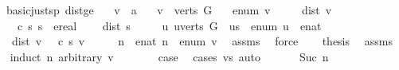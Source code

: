 \begin{isabellebody}
\endisatagproof
{\isafoldproof}%
%
\isadelimproof
\isanewline
%
\endisadelimproof
\isanewline
{}\isamarkupfalse%
\ {\isacharparenleft}\ basic{\isacharunderscore}just{\isacharunderscore}sp{\isacharparenright}\ dist{\isacharunderscore}ge{\isacharunderscore}{\isasymmu}{\isacharcolon}\isanewline
\ \ \ v\ {\isacharcolon}{\isacharcolon}\ {\isacharprime}a\isanewline
\ \ \ {\isachardoublequoteopen}v\ {\isasymin}\ verts\ G{\isachardoublequoteclose}\isanewline
\ \ \ {\isachardoublequoteopen}enum\ v\ {\isasymnoteq}\ {\isasyminfinity}{\isachardoublequoteclose}\isanewline
\ \ \ {\isachardoublequoteopen}dist\ v\ {\isasymnoteq}\ {\isacharminus}{\isasyminfinity}{\isachardoublequoteclose}\isanewline
\ \ \ {\isachardoublequoteopen}{\isasymmu}\ c\ s\ s\ {\isacharequal}\ ereal\ {}{\isachardoublequoteclose}\isanewline
\ \ \ {\isachardoublequoteopen}dist\ s\ {\isacharequal}\ {}{\isachardoublequoteclose}\isanewline
\ \ \ {\isachardoublequoteopen}{\isasymAnd}u{\isachardot}\ u{\isasymin}verts\ G\ {\isasymLongrightarrow}\ u{\isasymnoteq}s\ {\isasymLongrightarrow}\ enum\ u\ {\isasymnoteq}\ enat\ {}{\isachardoublequoteclose}\isanewline
\ \ \ {\isachardoublequoteopen}dist\ v\ {\isasymge}\ {\isasymmu}\ c\ s\ v{\isachardoublequoteclose}\isanewline
%
\isadelimproof
%
\endisadelimproof
%
\isatagproof
{}\isamarkupfalse%
\ {\isacharminus}\isanewline
\ \ \isamarkupfalse%
\ n\ \ {\isachardoublequoteopen}enat\ n\ {\isacharequal}\ enum\ v{\isachardoublequoteclose}\ \isamarkupfalse%
\ assms{\isacharparenleft}{}{\isacharparenright}\ \isamarkupfalse%
\ force\isanewline
\ \ \isamarkupfalse%
\ {\isacharquery}thesis\ \isamarkupfalse%
\ assms\isanewline
\ \ \isamarkupfalse%
{\isacharparenleft}induct\ n\ arbitrary{\isacharcolon}\ v{\isacharparenright}\ \isanewline
\ \ \isamarkupfalse%
\ {}\ \isamarkupfalse%
\ {\isacharquery}case\ \isamarkupfalse%
\ {\isacharparenleft}cases\ {\isachardoublequoteopen}v{\isacharequal}s{\isachardoublequoteclose}{\isacharcomma}\ auto{\isacharparenright}\isanewline
\ \ \isamarkupfalse%
\isanewline
\ \ \isamarkupfalse%
\ {\isacharparenleft}Suc\ n{\isacharparenright}\isanewline
\ \ \ \ \isamarkupfalse%

\end{isabellebody}
